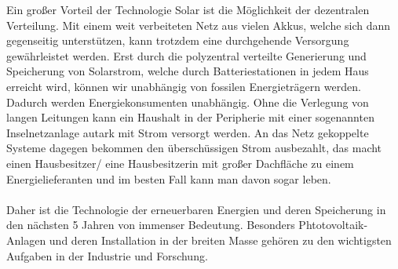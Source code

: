   Ein großer Vorteil der Technologie Solar ist die Möglichkeit der dezentralen Verteilung. Mit einem weit verbeiteten Netz aus vielen Akkus, welche sich dann gegenseitig unterstützen, kann trotzdem eine durchgehende Versorgung gewährleistet werden. Erst durch die polyzentral verteilte Generierung und Speicherung von Solarstrom, welche durch Batteriestationen in jedem Haus erreicht wird, können wir unabhängig von fossilen Energieträgern werden. Dadurch werden Energiekonsumenten unabhängig. Ohne die Verlegung von langen Leitungen kann ein Haushalt in der Peripherie mit einer sogenannten Inselnetzanlage autark mit Strom versorgt werden. An das Netz gekoppelte Systeme dagegen bekommen den überschüssigen Strom ausbezahlt, das macht einen Hausbesitzer/ eine Hausbesitzerin mit großer Dachfläche zu einem Energielieferanten und im besten Fall kann man davon sogar leben.\\\\
  Daher ist die Technologie der erneuerbaren Energien und deren Speicherung in den nächsten 5 Jahren von immenser Bedeutung. Besonders Phtotovoltaik-Anlagen und deren Installation in der breiten Masse gehören zu den wichtigsten Aufgaben in der Industrie und Forschung.
